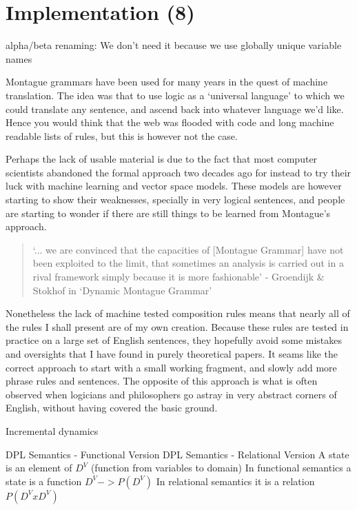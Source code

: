 \documentclass[12pt]{article}
\let\stdsection\section
\renewcommand\section{\newpage\stdsection}
\begin{document}
\section{Implementation (8)}

alpha/beta renaming: We don't need it because we use globally unique variable names

Montague grammars have been used for many years in the quest of machine translation. The idea was that to use logic as a `universal language' to which we could translate any sentence, and ascend back into whatever language we'd like. Hence you would think that the web was flooded with code and long machine readable lists of rules, but this is however not the case.

Perhaps the lack of usable material is due to the fact that most computer scientists abandoned the formal approach two decades ago for instead to try their luck with machine learning and vector space models. These models are however starting to show their weaknesses, specially in very logical sentences, and people are starting to wonder if there are still things to be learned from Montague's approach.
\begin{quotation}
`... we are convinced that the capacities of [Montague Grammar] have not been exploited to the limit, that sometimes an analysis is carried out in a rival framework simply because it is more fashionable' - Groendijk \& Stokhof in `Dynamic Montague Grammar'\cite{groenendijk1990dynamic}
\end{quotation}

Nonetheless the lack of machine tested composition rules means that nearly all of the rules I shall present are of my own creation. Because these rules are tested in practice on a large set of English sentences, they hopefully avoid some mistakes and oversights that I have found in purely theoretical papers. It seams like the correct approach to start with a small working fragment, and slowly add more phrase rules and sentences. The opposite of this approach is what is often observed when logicians and philosophers go astray in very abstract corners of English, without having covered the basic ground.




Incremental dynamics

DPL Semantics - Functional Version
DPL Semantics - Relational Version
A state is an element of $D^V$ (function from variables to domain)
In functional semantics a state is a function $D^V -> P(D^V)$
In relational semantics it is a relation $P(D^V x D^V)$
\end{document}
